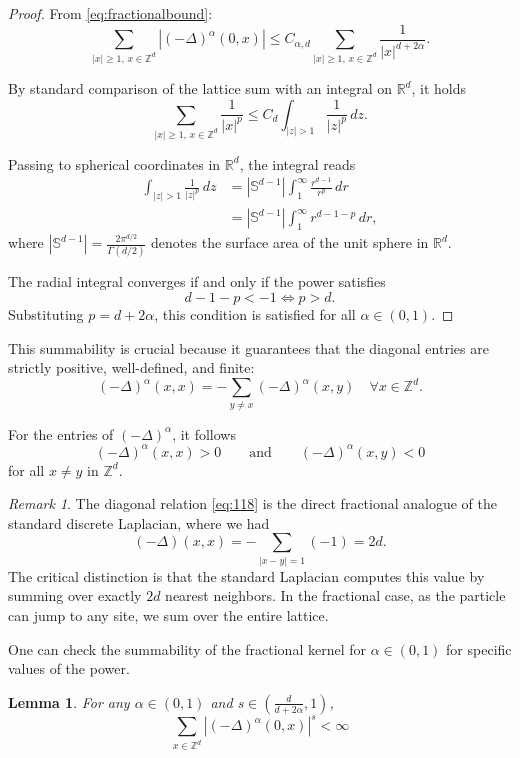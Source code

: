 \documentclass[11pt, a4paper, UKenglish, oneside]{book}
\theoremstyle{plain}
\newtheorem{lemma}[theorem]{Lemma}
\theoremstyle{remark}
\newtheorem{remark}[theorem]{Remark}
\theoremstyle{definition}
\numberwithin{equation}{section}
\numberwithin{theorem}{section}
\begin{document}
\begin{proof}
From \eqref{eq:fractionalbound}:
$$ \sum_{|x| \ge 1, \, x \in \mathbb{Z}^d} |(-\Delta)^\alpha(0,x)| \le C_{\alpha,d} \sum_{|x| \ge 1, \, x \in \mathbb{Z}^d} \frac{1}{|x|^{d+2\alpha}}.$$

By standard comparison of the lattice sum with an integral on $\mathbb{R}^d$, it holds
\[
\sum_{|x| \ge 1, \, x \in \mathbb{Z}^d} \frac{1}{|x|^p} \le C_d \int_{|z|>1} \frac{1}{|z|^p} \, dz.
\]

Passing to spherical coordinates in $\mathbb{R}^d$, the integral reads
\begin{align*}
\int_{|z| > 1} \frac{1}{|z|^p} \, dz
&= |\mathbb{S}^{d-1}| \int_{1}^\infty \frac{r^{d-1}}{r^p} \, dr \\
&= |\mathbb{S}^{d-1}| \int_{1}^\infty r^{d - 1 - p} \, dr,
\end{align*}
where $|\mathbb{S}^{d-1}| = \frac{2\pi^{d/2}}{\Gamma(d/2)}$ denotes the surface area of the unit sphere in $\mathbb{R}^d$.

The radial integral converges if and only if the power satisfies
\[
d - 1 - p < -1 \iff p > d.
\]
Substituting $p = d+2\alpha$, this condition is satisfied for all $\alpha \in (0,1)$.
\end{proof}

This summability is crucial because it guarantees that the diagonal entries are strictly positive, well-defined, and finite:
\begin{equation}
    (-\Delta)^{\alpha}(x,x) = -\sum_{y\ne x}(-\Delta)^{\alpha}(x,y)  \quad \forall x \in \mathbb{Z}^d. \label{eq:118}
\end{equation}

For the entries of $(- \Delta)^\alpha$, it follows
\begin{equation}
    (-\Delta)^\alpha(x,x) >0 \qquad \text{and}\qquad (-\Delta)^\alpha (x,y) <0 
\end{equation}
for all $x \ne y $ in $\mathbb{Z}^d$.

\begin{remark}
    The diagonal relation \eqref{eq:118} is the direct fractional analogue of the standard discrete Laplacian, where we had $$(-\Delta)(x,x) = - \sum_{|x-y|=1} (-1) = 2d.$$ The critical distinction is that the standard Laplacian computes this value by summing over exactly $2d$ nearest neighbors. In the fractional case, as the particle can jump to any site, we sum over the entire lattice.
\end{remark}

One can check the summability of the fractional kernel for $\alpha \in (0,1)$ for specific values of the power.
\begin{lemma}\label{lemma:summability}
    For any $\alpha \in (0,1)$ and $s \in \left(\frac{d}{d+2\alpha},1\right)$,
    \begin{equation}
    \sum_{x \in \mathbb{Z}^{d}} |(-\Delta)^{\alpha} (0,x)|^s < \infty \label{eq:Dsbound}
\end{equation}
\end{lemma}
\end{document}
